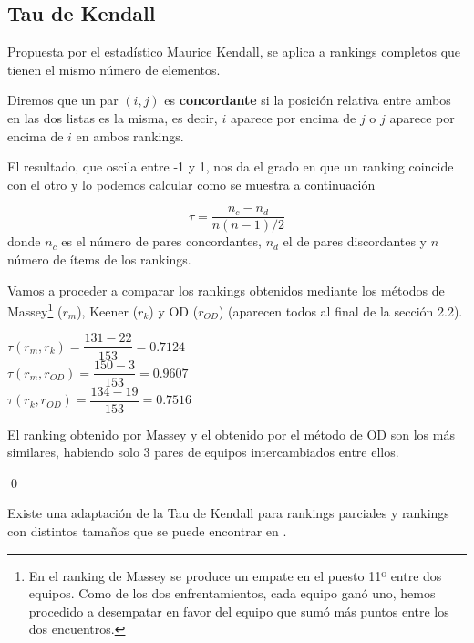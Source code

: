 \subsection{Tau de Kendall}
Propuesta por el estadístico Maurice Kendall, se aplica a rankings completos que tienen el mismo número de elementos. \\

\begin{defi} Diremos que un par $(i,j)$ es \textbf{concordante} si la posición relativa entre ambos en las dos listas es la misma, es decir, $i$ aparece por encima de $j$ o $j$ aparece por encima de $i$ en ambos rankings.
\end{defi}

El resultado, que oscila entre -1 y 1, nos da el grado en que un ranking coincide con el otro y lo podemos calcular como se muestra a continuación

\begin{equation}
\tau = \dfrac{n_{c} - n_{d}}{n(n-1)/2}
\end{equation}
donde $n_{c}$ es el número de pares concordantes, $n_{d}$ el de pares discordantes y $n$ número de ítems de los rankings. 

\newpage

\begin{ejem} Vamos a proceder a comparar los rankings obtenidos mediante los métodos de Massey\footnote{En el ranking de Massey se produce un empate en el puesto 11º entre dos equipos. Como de los dos enfrentamientos, cada equipo ganó uno, hemos procedido a desempatar en favor del equipo que sumó más puntos entre los dos encuentros.} ($r_{m}$), Keener ($r_{k}$) y OD ($r_{OD}$) (aparecen todos al final de la sección 2.2).
\end{ejem}
\begin{center}
$ \tau (r_{m},r_{k}) = \dfrac{131-22}{153} = 0.7124$\\
$ \tau (r_{m},r_{OD}) = \dfrac{150-3}{153} = 0.9607$\\
$ \tau (r_{k},r_{OD}) = \dfrac{134-19}{153} = 0.7516$
\end{center}
	
El ranking obtenido por Massey y el obtenido por el método de OD son los más similares, habiendo solo 3 pares de equipos intercambiados entre ellos.

\qed

Existe una adaptación de la Tau de Kendall para rankings parciales y rankings con distintos tamaños que se puede encontrar en \cite[pág 205,206]{cap16}.


